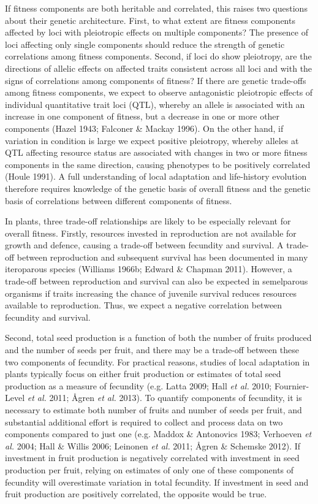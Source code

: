 \documentclass[]{article}
\begin{document}
If fitness components are both heritable and correlated, this raises two questions about their genetic architecture. First, to what extent are fitness components affected by loci with pleiotropic effects on multiple components? The presence of loci affecting only single components should reduce the strength of genetic correlations among fitness components. Second, if loci do show pleiotropy, are the directions of allelic effects on affected traits consistent across all loci and with the signs of correlations among components of fitness? If there are genetic trade-offs among fitness components, we expect to observe antagonistic pleiotropic effects of individual quantitative trait loci (QTL), whereby an allele is associated with an increase in one component of fitness, but a decrease in one or more other components (Hazel 1943; Falconer \& Mackay 1996). On the other hand, if variation in condition is large we expect positive pleiotropy, whereby alleles at QTL affecting resource status are associated with changes in two or more fitness components in the same direction, causing phenotypes to be positively correlated (Houle 1991). A full understanding of local adaptation and life-history evolution therefore requires knowledge of the genetic basis of overall fitness and the genetic basis of correlations between different components of fitness.

In plants, three trade-off relationships are likely to be especially relevant for overall fitness. Firstly, resources invested in reproduction are not available for growth and defence, causing a trade-off between fecundity and survival. A trade-off between reproduction and subsequent survival has been documented in many iteroparous species (Williams 1966b; Edward \& Chapman 2011). However, a trade-off between reproduction and survival can also be expected in semelparous organisms if traits increasing the chance of juvenile survival reduces resources available to reproduction. Thus, we expect a negative correlation between fecundity and survival.

Second, total seed production is a function of both the number of fruits produced and the number of seeds per fruit, and there may be a trade-off between these two components of fecundity. For practical reasons, studies of local adaptation in plants typically focus on either fruit production or estimates of total seed production as a measure of fecundity (e.g. Latta 2009; Hall \emph{et al.} 2010; Fournier-Level \emph{et al.} 2011; Ågren \emph{et al.} 2013). To quantify components of fecundity, it is necessary to estimate both number of fruits and number of seeds per fruit, and substantial additional effort is required to collect and process data on two components compared to just one (e.g. Maddox \& Antonovics 1983; Verhoeven \emph{et al.} 2004; Hall \& Willis 2006; Leinonen \emph{et al.} 2011; Ågren \& Schemske 2012). If investment in fruit production is negatively correlated with investment in seed production per fruit, relying on estimates of only one of these components of fecundity will overestimate variation in total fecundity. If investment in seed and fruit production are positively correlated, the opposite would be true.
\end{document}
